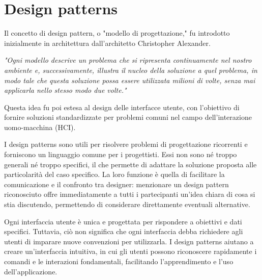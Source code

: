 \section{Design patterns}
Il concetto di design pattern, o "modello di progettazione," fu introdotto inizialmente in architettura dall'architetto Christopher Alexander. 
\begin{center}
\textit{"Ogni modello descrive un problema che si ripresenta continuamente nel nostro ambiente e, successivamente, illustra il nucleo della soluzione a quel problema, in modo tale che questa soluzione possa essere utilizzata milioni di volte, senza mai applicarla nello stesso modo due volte."}
\end{center}
Questa idea fu poi estesa al design delle interfacce utente, con l’obiettivo di fornire soluzioni standardizzate per problemi comuni nel campo dell'interazione uomo-macchina (HCI).

I design patterns sono utili per risolvere problemi di progettazione ricorrenti e forniscono un linguaggio comune per i progettisti. Essi non sono né troppo generali né troppo specifici, il che permette di adattare la soluzione proposta alle particolarità del caso specifico. La loro funzione è quella di facilitare la comunicazione e il confronto tra designer: menzionare un design pattern riconosciuto offre immediatamente a tutti i partecipanti un'idea chiara di cosa si stia discutendo, permettendo di considerare direttamente eventuali alternative.

Ogni interfaccia utente è unica e progettata per rispondere a obiettivi e dati specifici. Tuttavia, ciò non significa che ogni interfaccia debba richiedere agli utenti di imparare nuove convenzioni per utilizzarla. I design patterns aiutano a creare un'interfaccia intuitiva, in cui gli utenti possono riconoscere rapidamente i comandi e le interazioni fondamentali, facilitando l’apprendimento e l’uso dell'applicazione.

